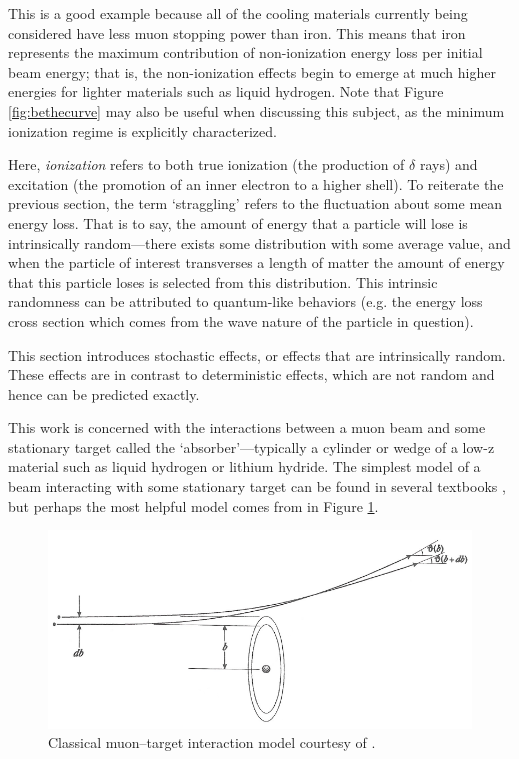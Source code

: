 This is a good example because all of the cooling materials currently being considered have less muon stopping power than iron. This means that iron represents the maximum contribution of non-ionization energy loss per initial beam energy; that is, the non-ionization effects begin to emerge at much higher energies for lighter materials such as liquid hydrogen. Note that Figure \ref{fig:bethecurve} may also be useful when discussing this subject, as the minimum ionization regime is explicitly characterized.

Here, \textit{ionization} refers to both true ionization (the production of $\delta$ rays) and excitation (the promotion of an inner electron to a higher shell). To reiterate the previous section, the term `straggling' refers to the fluctuation about some mean energy loss. That is to say, the amount of energy that a particle will lose is intrinsically random---there exists some distribution with some average value, and when the particle of interest transverses a length of matter the amount of energy that this particle loses is selected from this distribution. This intrinsic randomness can be attributed to quantum-like behaviors (e.g. the energy loss cross section which comes from the wave nature of the particle in question).

\par

This section introduces stochastic effects, or effects that are intrinsically random. These effects are in contrast to deterministic effects, which are not random and hence can be predicted exactly. 

This work is concerned with the interactions between a muon beam and some stationary target called the `absorber'---typically a cylinder or wedge of a low-z material such as liquid hydrogen or lithium hydride. The simplest model of a beam interacting with some stationary target can be found in several textbooks \cite{nielsen,griffithsqm}, but perhaps the most helpful model comes from \cite{jose} in Figure \ref{fig:scatteringmodel}.

\begin{figure}
  \centering
  \includegraphics[width=\textwidth]{Figures/scattering_model} 

  \caption{Classical muon--target interaction model courtesy of \cite{jose}.}
  \label{fig:scatteringmodel}
\end{figure}

